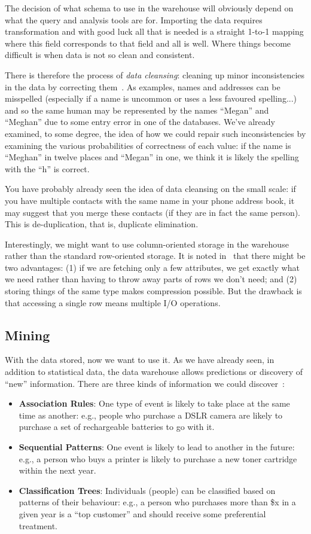 \documentclass[a4paper]{report}
\begin{document}
The decision of what schema to use in the warehouse will obviously depend on what the query and analysis tools are for. Importing the data requires transformation and with good luck all that is needed is a straight 1-to-1 mapping where this field corresponds to that field and all is well. Where things become difficult is when data is not so clean and consistent.

There is therefore the process of \textit{data cleansing}: cleaning up minor inconsistencies in the data by correcting them~\cite{dsc}. As examples, names and addresses can be misspelled (especially if a name is uncommon or uses a less favoured spelling...) and so the same human may be represented by the names ``Megan'' and ``Meghan'' due to some entry error in one of the databases. We've already examined, to some degree, the idea of how we could repair such inconsistencies by examining the various probabilities of correctness of each value: if the name is ``Meghan'' in twelve places and ``Megan'' in one, we think it is likely the spelling with the ``h'' is correct.

You have probably already seen the idea of data cleansing on the small scale: if you have multiple contacts with the same name in your phone address book, it may suggest that you merge these contacts (if they are in fact the same person). This is de-duplication, that is, duplicate elimination. 

Interestingly, we might want to use column-oriented storage in the warehouse rather than the standard row-oriented storage. It is noted in~\cite{dsc} that there might be two advantages: (1) if we are fetching only a few attributes, we get exactly what we need rather than having to throw away parts of rows we don't need; and (2) storing things of the same type makes compression possible. But the drawback is that accessing a single row means multiple I/O operations. 

\subsection*{Mining}

With the data stored, now we want to use it. As we have already seen, in addition to statistical data, the data warehouse allows predictions or discovery of ``new'' information. There are three kinds of information we could discover~\cite{fds}:

\begin{itemize}
	\item \textbf{Association Rules}: One type of event is likely to take place at the same time as another: e.g., people who purchase a DSLR camera are likely to purchase a set of rechargeable batteries to go with it.
	\item \textbf{Sequential Patterns}: One event is likely to lead to another in the future: e.g., a person who buys a printer is likely to purchase a new toner cartridge within the next year.
	\item \textbf{Classification Trees}: Individuals (people) can be classified based on patterns of their behaviour: e.g., a person who purchases more than \$x in a given year is a ``top customer'' and should receive some preferential treatment.
\end{itemize}
\end{document}
